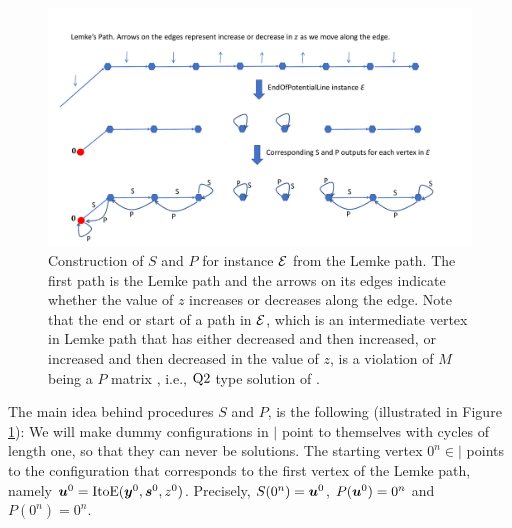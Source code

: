 \begin{figure}[htbp]
   \centering
  \includegraphics[width=\textwidth]{plcp-fig.pdf}
 \caption{Construction of $S$ and $P$ for \EOPL instance $\mbox{${\mathcal E}$}$ from the Lemke
 	path. The first path is the Lemke path and the arrows on its edges indicate
 	whether the value of $z$ increases or decreases along the edge.  Note that
 	the end or start of a path in $\mbox{${\mathcal E}$}$, which is an intermediate vertex in
 	Lemke path that has either decreased and then increased, or increased and then
 	decreased in the value of $z$, is a violation of $M$ being a $P$ matrix
 	\cite{cottle2009linear}, i.e., $\mbox{Q2}$ type solution of
 	\PLCP.}
 	\label{fig:path}
\end{figure}   


The main idea behind procedures $S$ and $P$, is the following (illustrated in Figure \ref{fig:path}):
We will make dummy configurations in $\vert$ point to themselves with cycles of
length one, so that they can never be solutions. 
The starting vertex $0^n \in \vert$ points to the configuration that corresponds
to the first vertex of the Lemke path, namely $\mbox{\boldmath $u$}^0=\mbox{ItoE}(\mbox{\boldmath $y$}^0,\mbox{\boldmath $s$}^0,z^0)$. 
Precisely, $S(0^n)=\mbox{\boldmath $u$}^0$, $P(\mbox{\boldmath $u$}^0)=0^n$ and $P(0^n)=0^n$.

